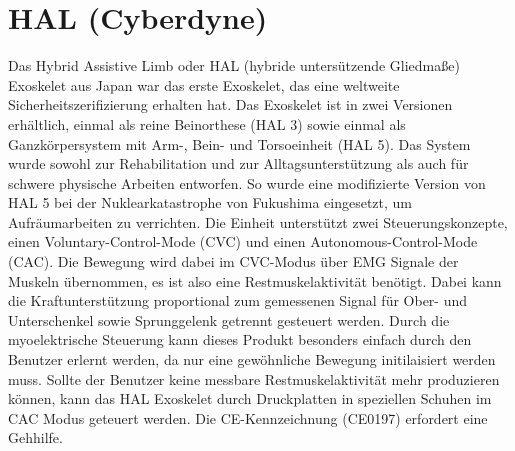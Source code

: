 \section{HAL (Cyberdyne)}  
Das Hybrid Assistive Limb oder HAL (hybride untersützende Gliedmaße) Exoskelet aus Japan war das erste Exoskelet, das eine weltweite Sicherheitszerifizierung erhalten hat\citep{Sankai.2011,Suzuki.2007}. Das Exoskelet ist in zwei Versionen erhältlich, einmal als reine Beinorthese (HAL 3) sowie einmal als Ganzkörpersystem mit Arm-, Bein- und Torsoeinheit (HAL 5). Das System wurde sowohl zur Rehabilitation und zur Alltagsunterstützung als auch für schwere physische Arbeiten entworfen. So wurde eine modifizierte Version von HAL 5 bei der Nuklearkatastrophe von Fukushima eingesetzt, um Aufräumarbeiten zu verrichten\citep{LarryGreenemeier.2011}. Die Einheit unterstützt zwei Steuerungskonzepte, einen Voluntary-Control-Mode (CVC) und einen Autonomous-Control-Mode (CAC). Die Bewegung wird dabei im CVC-Modus über EMG Signale der Muskeln übernommen, es ist also eine Restmuskelaktivität benötigt\citep{Kubota.2013}. Dabei kann die Kraftunterstützung proportional zum gemessenen Signal für Ober- und Unterschenkel sowie Sprunggelenk getrennt gesteuert werden. Durch die myoelektrische Steuerung kann dieses Produkt besonders einfach durch den Benutzer erlernt werden, da nur eine gewöhnliche Bewegung initilaisiert werden muss. Sollte der Benutzer keine messbare Restmuskelaktivität mehr produzieren können, kann das HAL Exoskelet durch Druckplatten in speziellen Schuhen im CAC Modus geteuert werden. Die CE-Kennzeichnung (CE0197) erfordert  eine Gehhilfe. 


